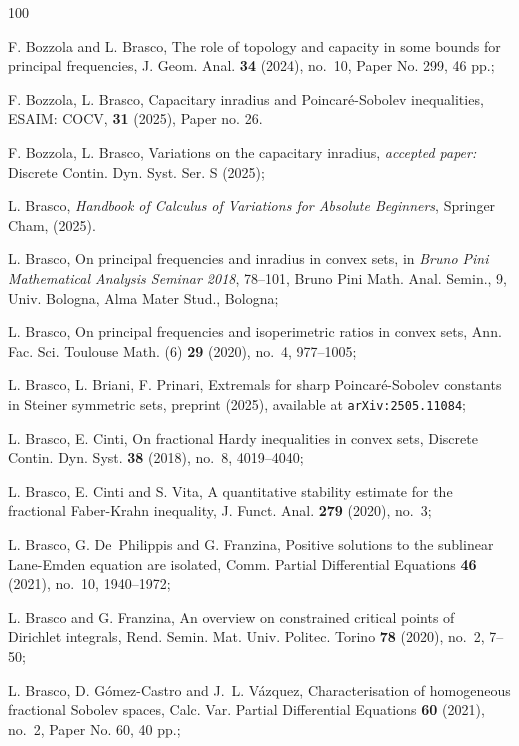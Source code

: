 \documentclass{amsart}
\theoremstyle{definition}
\numberwithin{equation}{section}
\begin{document}
\begin{thebibliography}{100}
	
	 F. Bozzola and L. Brasco, The role of topology and capacity in some bounds for principal frequencies, J. Geom. Anal. {\bf 34} (2024), no.~10, Paper No. 299, 46 pp.; 
	
	 F. Bozzola, L. Brasco, Capacitary inradius and Poincar\'e-Sobolev inequalities, ESAIM: COCV, {\bf 31} (2025), Paper no. 26.
	
	 F. Bozzola, L. Brasco, Variations on the capacitary inradius, {\it accepted paper:} Discrete Contin. Dyn. Syst. Ser. S (2025);
	
	 L. Brasco, {\it Handbook of Calculus of Variations for Absolute Beginners}, Springer Cham, (2025).
	
	 L. Brasco, On principal frequencies and inradius in convex sets, in {\it Bruno Pini Mathematical Analysis Seminar 2018}, 78--101, Bruno Pini Math. Anal. Semin., 9, Univ. Bologna, Alma Mater Stud., Bologna; 
	
	 L. Brasco, On principal frequencies and isoperimetric ratios in convex sets, Ann. Fac. Sci. Toulouse Math. (6) {\bf 29} (2020), no.~4, 977--1005;
	
	 L. Brasco, L. Briani, F. Prinari, Extremals for sharp Poincar\'e-Sobolev constants in Steiner symmetric sets, preprint (2025),  available at {\tt 	arXiv:2505.11084};
	
	 L. Brasco, E. Cinti, On fractional Hardy inequalities in convex sets, Discrete Contin. Dyn. Syst. {\bf 38} (2018), no.~8, 4019--4040;
	
	 L. Brasco, E. Cinti and S. Vita, A quantitative stability estimate for the fractional Faber-Krahn inequality, J. Funct. Anal. {\bf 279} (2020), no.~3;
	
	L. Brasco, G. De~Philippis and G. Franzina, Positive solutions to the sublinear Lane-Emden equation are isolated, Comm. Partial Differential Equations {\bf 46} (2021), no.~10, 1940--1972; 
	
	 L. Brasco and G. Franzina, An overview on constrained critical points of Dirichlet integrals, Rend. Semin. Mat. Univ. Politec. Torino {\bf 78} (2020), no.~2, 7--50; 
	
	 L. Brasco, D. G\'omez-Castro and J.~L. V\'azquez, Characterisation of homogeneous fractional Sobolev spaces, Calc. Var. Partial Differential Equations {\bf 60} (2021), no.~2, Paper No. 60, 40 pp.; 
	

\end{thebibliography}
\end{document}
